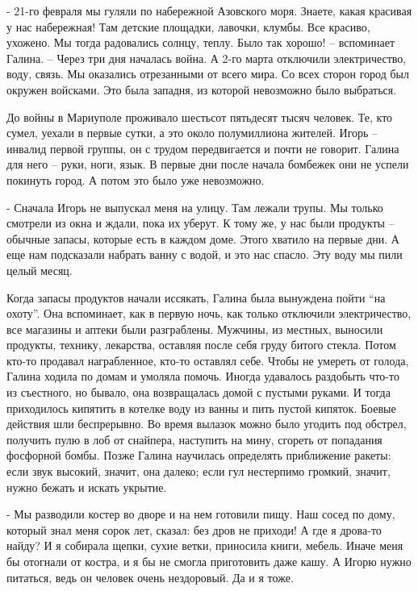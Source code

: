 -  21-го февраля мы гуляли по набережной Азовского моря. Знаете, какая красивая
у нас набережная! Там детские площадки, лавочки, клумбы. Все красиво, ухожено.
Мы тогда радовались солнцу, теплу. Было так хорошо! – вспоминает Галина. –
Через три дня началась война. А 2-го марта отключили электричество, воду,
связь. Мы оказались отрезанными от всего мира. Со всех сторон город был окружен
войсками. Это была западня, из которой невозможно было выбраться.

До войны в Мариуполе проживало шестьсот пятьдесят тысяч человек. Те, кто сумел,
уехали в первые сутки, а это около полумиллиона жителей. Игорь – инвалид первой
группы, он с трудом передвигается и почти не говорит. Галина для него – руки,
ноги, язык. В первые дни после начала бомбежек они не успели покинуть город. А
потом это было уже невозможно. 

- Сначала Игорь не выпускал меня на улицу. Там лежали трупы. Мы только смотрели
из окна и ждали, пока их уберут. К тому же, у нас были продукты – обычные
запасы, которые есть в каждом доме. Этого хватило на первые дни. А еще нам
подсказали набрать ванну с водой, и это нас спасло. Эту воду мы пили целый
месяц. 

Когда запасы продуктов начали иссякать, Галина была вынуждена пойти \enquote{на охоту}.
Она вспоминает, как в первую ночь, как только отключили электричество, все
магазины и аптеки были разграблены. Мужчины, из местных, выносили продукты,
технику, лекарства, оставляя после себя груду битого стекла. Потом кто-то
продавал награбленное, кто-то оставлял себе. Чтобы не умереть от голода, Галина
ходила по домам и умоляла помочь. Иногда удавалось раздобыть что-то из
съестного, но бывало, она возвращалась домой с пустыми руками. И тогда
приходилось кипятить в котелке воду из ванны и пить пустой кипяток. Боевые
действия шли беспрерывно. Во время вылазок можно было угодить под обстрел,
получить пулю в лоб от снайпера, наступить на мину, сгореть от попадания
фосфорной бомбы. Позже Галина научилась определять приближение ракеты: если
звук высокий, значит, она далеко; если гул нестерпимо громкий, значит, нужно
бежать и искать укрытие.

- Мы разводили костер во дворе и на нем готовили пищу. Наш сосед по дому,
который знал меня сорок лет, сказал: без дров не приходи! А где я дрова-то
найду? И я собирала щепки, сухие ветки, приносила книги, мебель. Иначе меня бы
отогнали от костра, и я бы не смогла приготовить даже кашу. А Игорю нужно
питаться, ведь он человек очень нездоровый. Да и я тоже. 

